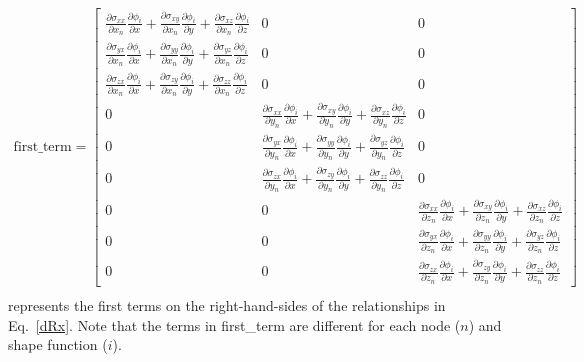 \begin{eqnarray}
\text{first\_term} = 
%
\begin{bmatrix}
\frac{\partial \sigma_{xx}}{\partial x_n}\frac{\partial \phi_i}{\partial x} + \frac{\partial \sigma_{xy}}{\partial x_n}\frac{\partial \phi_i}{\partial y} + \frac{\partial \sigma_{xz}} {\partial x_n}\frac{\partial \phi_i}{\partial z} & 0 & 0 \\
%
\frac{\partial \sigma_{yx}}{\partial x_n}\frac{\partial \phi_i}{\partial x} + \frac{\partial \sigma_{yy}}{\partial x_n}\frac{\partial \phi_i}{\partial y} + \frac{\partial \sigma_{yz}} {\partial x_n}\frac{\partial \phi_i}{\partial z}  & 0 & 0 \\
%
\frac{\partial \sigma_{zx}}{\partial x_n}\frac{\partial \phi_i}{\partial x} + \frac{\partial \sigma_{zy}}{\partial x_n}\frac{\partial \phi_i}{\partial y} + \frac{\partial \sigma_{zz}} {\partial x_n}\frac{\partial \phi_i}{\partial z} & 0 & 0 \\
0 & \frac{\partial \sigma_{xx}}{\partial y_n}\frac{\partial \phi_i}{\partial x} + \frac{\partial \sigma_{xy}}{\partial y_n}\frac{\partial \phi_i}{\partial y} + \frac{\partial \sigma_{xz}} {\partial y_n}\frac{\partial \phi_i}{\partial z} & 0 \\
%
0 & \frac{\partial \sigma_{yx}}{\partial y_n}\frac{\partial \phi_i}{\partial x} + \frac{\partial \sigma_{yy}}{\partial y_n}\frac{\partial \phi_i}{\partial y} + \frac{\partial \sigma_{yz}} {\partial y_n}\frac{\partial \phi_i}{\partial z} & 0 \\
%
0 & \frac{\partial \sigma_{zx}}{\partial y_n}\frac{\partial \phi_i}{\partial x} + \frac{\partial \sigma_{zy}}{\partial y_n}\frac{\partial \phi_i}{\partial y} + \frac{\partial \sigma_{zz}} {\partial y_n}\frac{\partial \phi_i}{\partial z} & 0 \\
0 & 0 & \frac{\partial \sigma_{xx}}{\partial z_n}\frac{\partial \phi_i}{\partial x} + \frac{\partial \sigma_{xy}}{\partial z_n}\frac{\partial \phi_i}{\partial y} + \frac{\partial \sigma_{xz}} {\partial z_n}\frac{\partial \phi_i}{\partial z}  \\
%
0 & 0 & \frac{\partial \sigma_{yx}}{\partial z_n}\frac{\partial \phi_i}{\partial x} + \frac{\partial \sigma_{yy}}{\partial z_n}\frac{\partial \phi_i}{\partial y} + \frac{\partial \sigma_{yz}} {\partial z_n}\frac{\partial \phi_i}{\partial z}  \\
%
0 & 0 & \frac{\partial \sigma_{zx}}{\partial z_n}\frac{\partial \phi_i}{\partial x} + \frac{\partial \sigma_{zy}}{\partial z_n}\frac{\partial \phi_i}{\partial y} + \frac{\partial \sigma_{zz}} {\partial z_n} \frac{\partial \phi_i}{\partial z} 
\end{bmatrix}
\nonumber\\
\end{eqnarray}
%
represents the first terms on the right-hand-sides of the relationships in Eq.\ \eqref{dRx}. Note that the terms in first\_term are different for each node ($n$) and shape function ($i$). 

